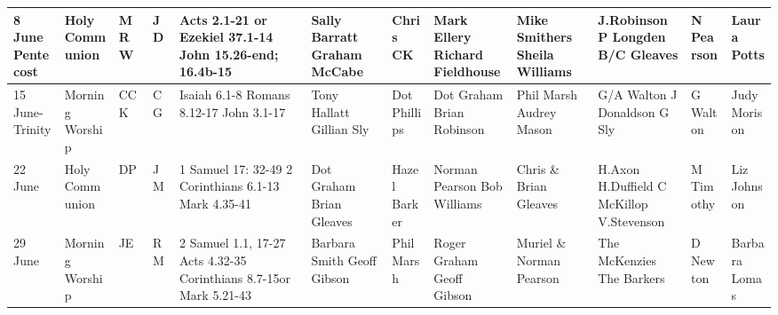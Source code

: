 \documentclass[10pt,a4paper]{article}
\begin{document}
\begin{center}
{\begin{tabular}{|p{1.6cm}|p{1.4cm}|p{0.6cm}|p{0.6cm}|p{3.2cm}|p{2cm}|p{1.5cm}|p{2cm}|p{2.0cm}|p{2.4cm}
|p{1.6cm}|p{1.6cm}|}
 8 June \linebreak Pentecost & Holy Communion &  MRW & JD & 
 Acts 2.1-21 or Ezekiel 37.1-14
John 15.26-end; 16.4b-15
 & Sally Barratt Graham McCabe  & Chris CK &
Mark Ellery Richard Fieldhouse & Mike Smithers Sheila Williams & 
J.Robinson \linebreak P Longden  \linebreak B/C Gleaves
  &  N Pearson   & Laura Potts \\ \hline
15 June-  Trinity & Morning Worship   & CCK  & CG  & 
Isaiah 6.1-8
Romans 8.12-17 \linebreak
John 3.1-17
& 
Tony Hallatt Gillian Sly & Dot Phillips &
Dot Graham Brian Robinson &  Phil Marsh Audrey Mason & 
G/A Walton  \linebreak J Donaldson  \linebreak G Sly
 &  G Walton & Judy \linebreak Morison  \\ 
\hline
22 June  & Holy Communion & DP  & JM &
1 Samuel 17: 32-49
2 Corinthians 6.1-13
Mark 4.35-41
& Dot Graham Brian Gleaves  &  Hazel Barker & Norman Pearson \linebreak Bob Williams & 
Chris \& \linebreak Brian Gleaves   & 
 H.Axon  \linebreak H.Duffield   C McKillop    V.Stevenson
&  M Timothy &  Liz Johnson \\
\hline %
29 June & Morning Worship
 & JE & RM & 
2 Samuel 1.1, 17-27 
Acts 4.32-35
\linebreak 2 Corinthians 8.7-15\linebreak or %
Mark 5.21-43
&  
Barbara Smith Geoff Gibson  & 
Phil Marsh  & Roger Graham Geoff Gibson & 
Muriel \& Norman Pearson  &
The Mc\-Kenzies The Barkers
 & D Newton & Barbara \linebreak Lomas \\
\hline

\end{tabular}}
\end{center}
\end{document}
